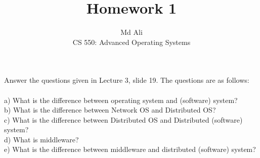 \documentclass[12pt]{article}
\newenvironment{exercise}[2][Exercise]{\begin{trivlist}
\item[\hskip \labelsep {\bfseries #1}\hskip \labelsep {\bfseries #2.}]}{\end{trivlist}}
\begin{document}
 
\title{Homework 1}
\author{Md Ali\\ 
CS 550: Advanced Operating Systems} 
 
\maketitle
 
\begin{exercise}{1}
Answer the questions given in Lecture 3, slide 19. The questions are as follows: \\ \\
a) What is the difference between operating system and (software) system? \\ 
b) What is the difference between Network OS and Distributed OS? \\
c) What is the difference between Distributed OS and Distributed (software) system? \\
d) What is middleware? \\ 
e) What is the difference between middleware and distributed (software) system? 
\end{exercise} 
\end{document}
